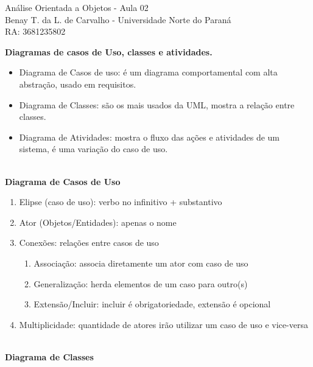 \documentclass[12pt, a4paper]{article}
\begin{document}
\begin{center}

    {\LARGE
        Análise Orientada a Objetos - Aula 02\\
    }
    {\Large
        Benay T. da L. de Carvalho - Universidade Norte do Paraná\\
        RA: 3681235802
    }

\end{center}

\vspace{1cm}

\large

\noindent
\textbf{Diagramas de casos de Uso, classes e atividades.} 

\begin{itemize}
    \item Diagrama de Casos de uso: é um diagrama comportamental com alta abstração, usado em requisitos.
    \item Diagrama de Classes: são os mais usados da UML, mostra a relação entre classes.
    \item Diagrama de Atividades: mostra o fluxo das ações e atividades de um sistema, 
    é uma variação do caso de uso.
\end{itemize}

\indent
\textbf{\\Diagrama de Casos de Uso}

\begin{enumerate}[label*=\textbf{\arabic*}.]

    \item Elipse (caso de uso): verbo no infinitivo + substantivo
    \item Ator (Objetos/Entidades): apenas o nome
    \item Conexões: relações entre casos de uso
    \begin{enumerate}[label*=\textbf{\arabic*}.]
        \item Associação: associa diretamente um ator com caso de uso
        \item Generalização: herda elementos de um caso para outro(s)
        \item Extensão/Incluir: incluir é obrigatoriedade, extensão é opcional
    \end{enumerate}
    \item Multiplicidade: quantidade de atores irão utilizar um caso de uso e vice-versa
\end{enumerate}

\indent
\textbf{\\Diagrama de Classes}
\end{document}
